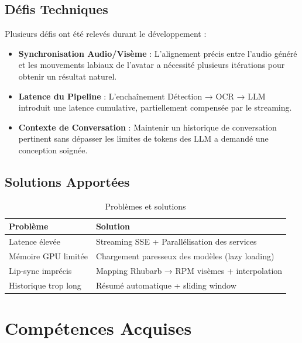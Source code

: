 \subsection{Défis Techniques}

Plusieurs défis ont été relevés durant le développement :

\begin{itemize}
    \item \textbf{Synchronisation Audio/Visème} : L'alignement précis entre l'audio généré et les mouvements labiaux de l'avatar a nécessité plusieurs itérations pour obtenir un résultat naturel.
    
    \item \textbf{Latence du Pipeline} : L'enchaînement Détection → OCR → LLM introduit une latence cumulative, partiellement compensée par le streaming.
    
    \item \textbf{Contexte de Conversation} : Maintenir un historique de conversation pertinent sans dépasser les limites de tokens des LLM a demandé une conception soignée.
\end{itemize}

\subsection{Solutions Apportées}

\begin{table}[H]
\centering

\label{tab:solutions}
\begin{tabular}{@{}p{5cm}p{9cm}@{}}
\toprule
\textbf{Problème} & \textbf{Solution} \\
\midrule
Latence élevée & Streaming SSE + Parallélisation des services \\
Mémoire GPU limitée & Chargement paresseux des modèles (lazy loading) \\
Lip-sync imprécis & Mapping Rhubarb → RPM visèmes + interpolation \\
Historique trop long & Résumé automatique + sliding window \\
\bottomrule
\end{tabular}
\caption{Problèmes et solutions}
\end{table}

\section{Compétences Acquises}

